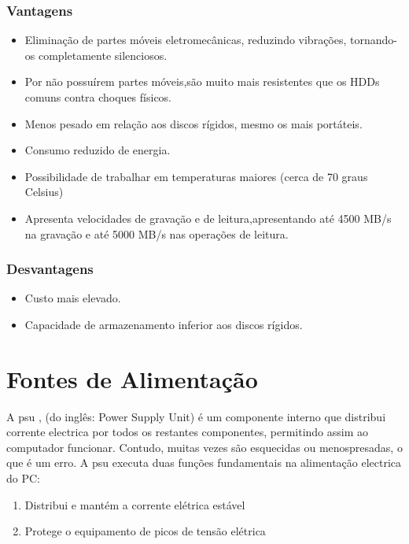 \subsection{Vantagens}
\begin{itemize}
\item Eliminação de partes móveis eletromecânicas, reduzindo vibrações, tornando-os completamente silenciosos.
\item Por não possuírem partes móveis,são muito mais resistentes que os HDDs comuns contra choques físicos.
\item Menos pesado em relação aos discos rígidos, mesmo os mais portáteis.
\item Consumo reduzido de energia. 
\item Possibilidade de trabalhar em temperaturas maiores (cerca de 70 graus Celsius) 
\item Apresenta velocidades de gravação e de leitura,apresentando até 4500 MB/s na gravação e até 5000 MB/s nas operações de leitura.
\end{itemize}
\subsection{Desvantagens} 
\begin{itemize}
\item Custo mais elevado.
\item Capacidade de armazenamento inferior aos discos rígidos.
\end{itemize}  






\chapter{Fontes de Alimentação}
\label{chap.psu}

A \ac{psu} , (do inglês: Power Supply Unit) é um componente interno que distribui corrente electrica por todos os restantes componentes, permitindo assim ao computador funcionar. Contudo, muitas vezes são esquecidas ou menospresadas, o que é um erro. A \ac{psu} executa duas funções fundamentais na alimentação electrica do PC:

	\begin{enumerate}
	\item Distribui e mantém a corrente elétrica estável
	\item Protege o equipamento de picos de tensão elétrica
	\end{enumerate}
	
